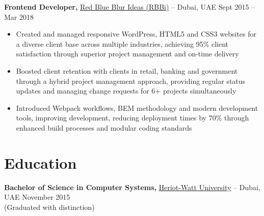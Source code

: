 \documentclass[10pt,letterpaper]{article}
\begin{document}
\textbf{Frontend Developer,} \href{https://www.rbbideas.com/}{Red Blue Blur Ideas (RBBi)} -- Dubai, UAE \hfill Sept 2015 -- Mar 2018 \\
\vspace{-1pt}
\begin{itemize}
  \item Created and managed responsive WordPress, HTML5 and CSS3 websites for a diverse client base across multiple industries, achieving 95\% client satisfaction through superior project management and on-time delivery
  \item Boosted client retention with clients in retail, banking and government through a hybrid project management approach, providing regular status updates and managing change requests for 6+ projects simultaneously
  \item Introduced Webpack workflows, BEM methodology and modern development tools, improving development, reducing deployment times by 70\% through enhanced build processes and modular coding standards
\end{itemize}


\vspace{-9.5pt}


\section*{Education}
\textbf{Bachelor of Science in Computer Systems,} \href{https://www.hw.ac.uk/dubai}{Heriot-Watt University} -- Dubai, UAE \hfill November 2015 \\
(Graduated with distinction)

\end{document}
